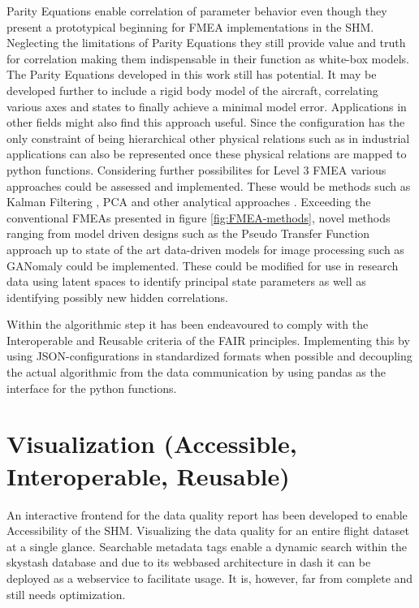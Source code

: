 Parity Equations enable correlation of parameter behavior even though they present a prototypical beginning for FMEA implementations in the SHM. Neglecting the limitations of Parity Equations they still provide value and truth for correlation making them indispensable in their function as white-box models. The Parity Equations developed in this work still has potential. It may be developed further to include a rigid body model of the aircraft, correlating various axes and states to finally achieve a minimal model error.
Applications in other fields might also find this approach useful. Since the configuration has the only constraint of being hierarchical other physical relations such as in industrial applications can also be represented once these physical relations are mapped to python functions.
Considering further possibilites for Level 3 FMEA various approaches could be assessed and implemented. These would be methods such as Kalman Filtering \cite{lie_synthetic_2013}, PCA \cite{isermann_fault-diagnosis_2006} and other analytical approaches \cite{freeman_air_2013, perhinschi_integrated_2010}.  Exceeding the conventional FMEAs presented in figure \ref{fig:FMEA-methods}, novel methods ranging from model driven designs such as the Pseudo Transfer Function approach \cite{aljanaideh_aircraft_2015} up to state of the art data-driven models for image processing such as GANomaly \cite{akcay_ganomaly_2018} could be implemented. These could be modified for use in research data using latent spaces to identify principal state parameters as well as identifying possibly new hidden correlations.

Within the algorithmic step it has been endeavoured to comply with the Interoperable and Reusable criteria of the FAIR principles. Implementing this by using JSON-configurations in standardized formats when possible and decoupling the actual algorithmic from the data communication by using pandas as the interface for the python functions.

\section{Visualization (Accessible, Interoperable, Reusable)}
An interactive frontend for the data quality report has been developed to enable Accessibility of the SHM. Visualizing the data quality for an entire flight dataset at a single glance. Searchable metadata tags enable a dynamic search within the skystash database and due to its webbased architecture in dash it can be deployed as a webservice to facilitate usage. It is, however, far from complete and still needs optimization.

